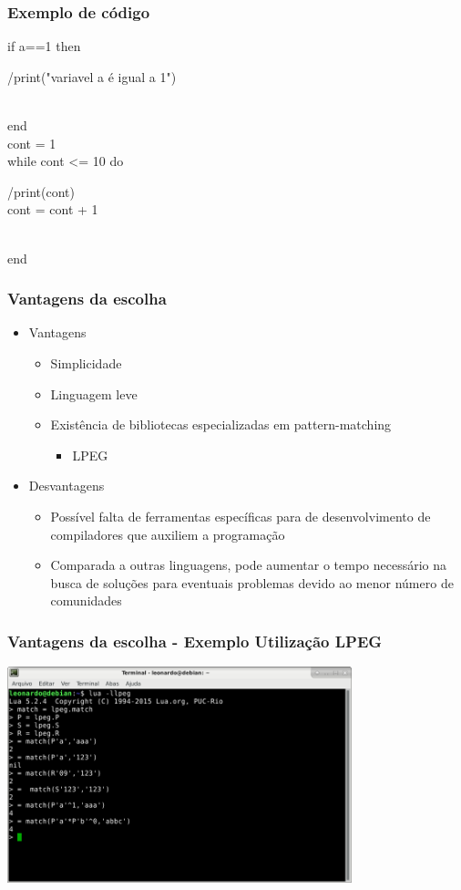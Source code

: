 \documentclass{beamer}
\begin{document}
\begin{frame}
    \frametitle{Exemplo de código}
    if a==1 then\\
        \begin{tabular} /print("variavel a é igual a 1")
        \end{tabular}\\
    end\\
    \newline
    cont = 1\\
    while cont <= 10 do\\
        \begin{tabular} /print(cont)\\
        cont = cont + 1
        \end{tabular}\\
    end
\end{frame}

\begin{frame}
    \frametitle{Vantagens da escolha}
    \begin{itemize} 
        \item Vantagens
        \begin{itemize}
            \item Simplicidade 
            \item Linguagem leve
            \item Existência de bibliotecas especializadas em pattern-matching
                \begin{itemize}
                    \item LPEG
                \end{itemize}
        \end{itemize}
        \item Desvantagens
        \begin{itemize}
            \item Possível falta de ferramentas específicas para de desenvolvimento de compiladores que auxiliem a programação
            \item Comparada a outras linguagens, pode aumentar o tempo necessário na busca de soluções para eventuais problemas devido ao menor número de comunidades
        \end{itemize}
    \end{itemize}
\end{frame}

\begin{frame}
    \frametitle{Vantagens da escolha - Exemplo Utilização LPEG}
    \includegraphics[width=10cm]{images/lpeg.png}
\end{frame}
\end{document}

